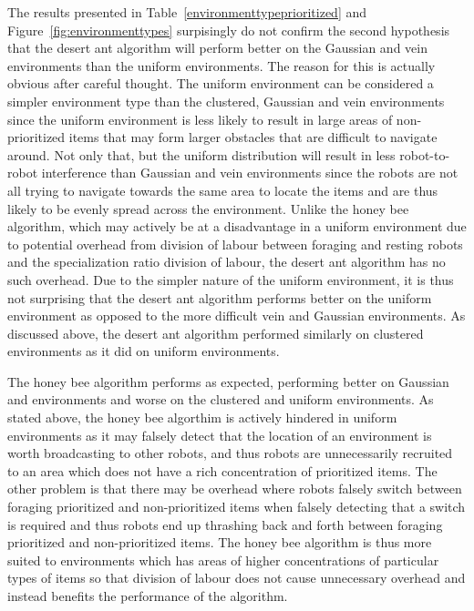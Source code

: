 The results presented in Table~\ref{environmenttypeprioritized} and Figure~\ref{fig:environmenttypes} surpisingly do not confirm the second hypothesis that the desert ant algorithm will perform better on the Gaussian and vein environments than the uniform environments. The reason for this is actually obvious after careful thought. The uniform environment can be considered a simpler environment type than the  clustered, Gaussian and vein environments since the uniform environment is less likely to result in large areas of non-prioritized items that may form larger obstacles that are difficult to navigate around. Not only that, but the uniform distribution will result in less robot-to-robot interference than Gaussian and vein environments since the robots are not all trying to navigate towards the same area to locate the items and are thus likely to be evenly spread across the environment. Unlike the honey bee algorithm, which may actively be at a disadvantage in a uniform environment due to potential overhead from division of labour between foraging and resting robots and the specialization ratio division of labour, the desert ant algorithm has no such overhead. Due to the simpler nature of the uniform environment, it is thus not surprising that the desert ant algorithm performs better on the uniform environment as opposed to the more difficult vein and Gaussian environments. As discussed above, the desert ant algorithm performed similarly on clustered environments as it did on uniform environments. 

The honey bee algorithm performs as expected, performing better on Gaussian and environments and worse on the clustered and uniform environments. As stated above, the honey bee algorthim is actively hindered in uniform environments as it may falsely detect that the location of an environment is worth broadcasting to other robots, and thus robots are unnecessarily recruited to an area which does not have a rich concentration of prioritized items. The other problem is that there may be overhead where robots falsely switch between foraging prioritized and non-prioritized items when falsely detecting that a switch is required and thus robots end up thrashing back and forth between foraging prioritized and non-prioritized items. The honey bee algorithm is thus more suited to environments which has areas of higher concentrations of particular types of items so that division of labour does not cause unnecessary overhead and instead benefits the performance of the algorithm. 

